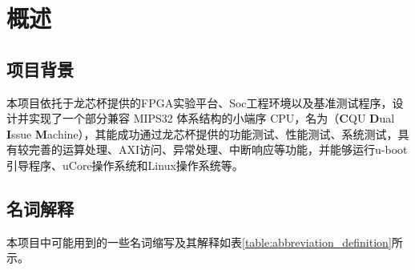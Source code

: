 \chapter{概述}

\section{项目背景}
本项目依托于龙芯杯提供的FPGA实验平台、Soc工程环境以及基准测试程序，设计并实现了一个部分兼容 MIPS32 体系结构的小端序 CPU，名为\cpuname（\textbf{C}QU \textbf{D}ual \textbf{I}ssue \textbf{M}achine），其能成功通过龙芯杯提供的功能测试、性能测试、系统测试，具有较完善的运算处理、AXI访问、异常处理、中断响应等功能，并能够运行u-boot引导程序、uCore操作系统和Linux操作系统等。

\section{名词解释}
本项目中可能用到的一些名词缩写及其解释如表\ref{table:abbreviation_definition}所示。

